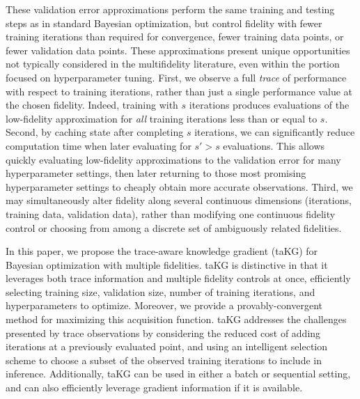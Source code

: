 \documentclass[letterpaper]{article}
\numberwithin{equation}{section}
\begin{document}
These validation error approximations 
perform the same training and testing steps as in standard Bayesian optimization, but control fidelity with fewer training iterations than required for convergence, fewer training data points, or fewer validation data points. 
These approximations present unique opportunities not typically considered in the multifidelity literature, even within the portion focused on hyperparameter tuning. 
First, we observe a full \emph{trace} of performance with respect to training iterations, rather than just a single performance value at the chosen fidelity.
Indeed, training with $s$ iterations produces evaluations of the low-fidelity approximation for {\it all} training iterations less than or equal to $s$.  
Second, by caching state after completing $s$ iterations, we can significantly reduce computation time when later evaluating for $s'>s$ evaluations.  This allows quickly evaluating low-fidelity approximations to the validation error for many hyperparameter settings, then later returning to those most promising hyperparameter settings to cheaply obtain more accurate observations.
Third, we may simultaneously alter fidelity along several continuous dimensions (iterations, training data, validation data), rather than modifying one continuous fidelity control or choosing from among a discrete set of ambiguously related fidelities.


In this paper, we propose the trace-aware knowledge gradient (taKG) for Bayesian optimization with multiple fidelities. taKG is distinctive in that it leverages both trace information and multiple fidelity controls at once, efficiently selecting training size, validation size, number of training iterations, and hyperparameters to optimize. Moreover, we provide a provably-convergent method for maximizing this acquisition function.
taKG addresses the challenges presented by trace observations by considering the reduced cost of adding iterations at a previously evaluated point, and using an intelligent selection scheme to choose a subset of the observed training iterations to include in inference.
Additionally, taKG can be used in either a batch or sequential setting, and can also efficiently leverage gradient information if it is available.
\end{document}
